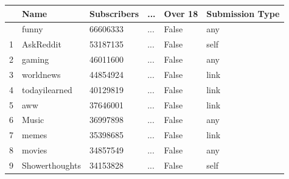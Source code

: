 \documentclass[
  12pt,
  letterpaper,
  DIV=11,
  numbers=noendperiod]{scrartcl}
\begin{document}
\begin{longtable}[]{@{}llllll@{}}
\toprule\noalign{}
& Name & Subscribers & ... & Over 18 & Submission Type \\
\midrule\noalign{}
\endhead
\bottomrule\noalign{}
\endlastfoot
0 & funny & 66606333 & ... & False & any \\
1 & AskReddit & 53187135 & ... & False & self \\
2 & gaming & 46011600 & ... & False & any \\
3 & worldnews & 44854924 & ... & False & link \\
4 & todayilearned & 40129819 & ... & False & link \\
5 & aww & 37646001 & ... & False & link \\
6 & Music & 36997898 & ... & False & any \\
7 & memes & 35398685 & ... & False & link \\
8 & movies & 34857549 & ... & False & any \\
9 & Showerthoughts & 34153828 & ... & False & self \\
\end{longtable}
\end{document}
